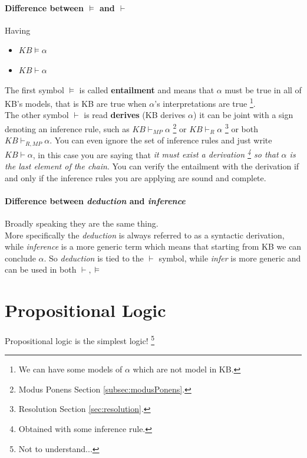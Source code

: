 \documentclass[10pt,a4paper]{article}
\begin{document}
\paragraph{Difference between $\models$ and $\vdash$}
Having 
\begin{itemize}
\item $KB\models \alpha$
\item $KB \vdash \alpha$
\end{itemize}
The first symbol $\models$  is called \textbf{entailment} and means that $\alpha$ must be true in all of KB's models, that is KB  are true when $\alpha$'s interpretations are true \footnote{We can have some models of $\alpha$ which are not model in KB.}.\\
The other symbol $\vdash$ is read \textbf{derives} (KB derives $\alpha$) it can be joint with a sign denoting an inference rule, such as $KB \vdash_{MP}\alpha$ \footnote{Modus Ponens Section \ref{subsec:modusPonens}.} or $KB \vdash_{R}\alpha$ \footnote{Resolution Section \ref{sec:resolution}.} or both $KB \vdash_{R,MP}\alpha$. You can even ignore the set of inference rules and just write $KB \vdash\alpha$, in this case you are saying that \textit{it must exist a derivation \footnote{Obtained with some inference rule.} so that $\alpha$ is the last element of the chain}. You can verify the entailment with the derivation if and only if the inference rules you are applying are sound and complete.


\paragraph{Difference between \textit{deduction} and \textit{inference}}
Broadly speaking they are the same thing.\\
More specifically the \textit{deduction} is always referred to as a syntactic derivation, while \textit{inference} is a more generic  term which means that starting from KB we can conclude $\alpha$. So \textit{deduction} is tied to the $\vdash$ symbol, while \textit{infer} is more generic and can be used in both $\vdash, \models$

\newpage
\section{Propositional Logic}
Propositional logic is the simplest logic! \footnote{Not to understand...}
\end{document}
